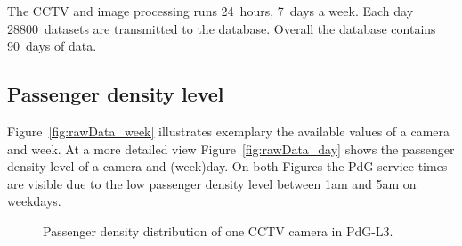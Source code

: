 The CCTV and image processing runs 24~hours, 7~days a week. Each day 28800~datasets are transmitted to the database. Overall the database contains 90~days of data.

\subsection{Passenger density level}
\label{subsec:PassengerDensityLevel}

Figure~\ref{fig:rawData_week} illustrates exemplary the available values of a camera and week. At a more detailed view Figure~\ref{fig:rawData_day} shows the passenger density level of a camera and (week)day. On both Figures the PdG service times are visible due to the low passenger density level between 1am and 5am on weekdays.

\begin{figure}[htb]

  \centering

  \hfill

  \caption{Passenger density distribution of one CCTV camera in PdG-L3.}
  \label{fig:rawData}

\end{figure}


